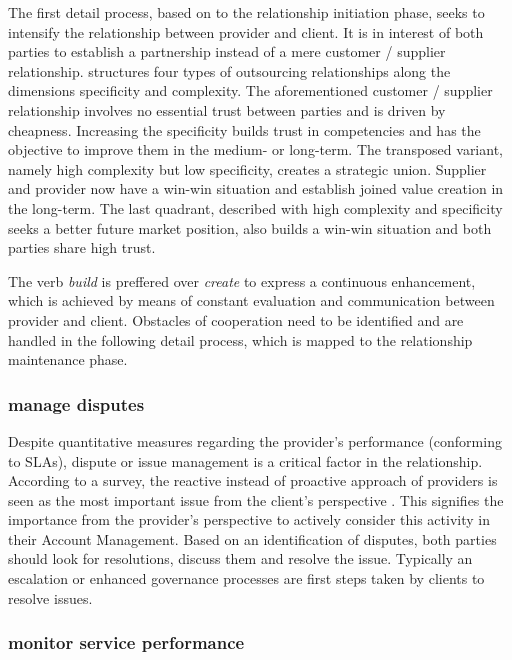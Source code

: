 	The first detail process, based on to the relationship initiation phase, seeks to intensify the relationship between provider and client. It is in interest of both parties to establish a partnership instead of a mere customer / supplier relationship. \cite{Franceschini_2003} structures four types of outsourcing relationships along the dimensions specificity and complexity. The aforementioned customer / supplier relationship involves no essential trust between parties and is driven by cheapness. Increasing the specificity builds trust in competencies and has the objective to improve them in the medium- or long-term. The transposed variant, namely high complexity but low specificity, creates a strategic union. Supplier and provider now have a win-win situation and establish joined value creation in the long-term. The last quadrant, described with high complexity and specificity seeks a better future market position, also builds a win-win situation and both parties share high trust. 
	
	The verb \textit{build} is preffered over \textit{create} to express a continuous enhancement, which is achieved by means of constant evaluation and communication between provider and client. Obstacles of cooperation need to be identified and are handled in the following detail process, which is mapped to the relationship maintenance phase. 
		
	\subsubsection{manage disputes}
	
	Despite quantitative measures regarding the provider's performance (\eg conforming to \acrshort{SLA}s), dispute or issue management is a critical factor in the relationship. According to a survey, the reactive instead of proactive approach of providers is seen as the most important issue from the client's perspective \citep{deloitte2014outsourcing}. This signifies the importance from the provider's perspective to actively consider this activity in their Account Management. Based on an identification of disputes, both parties should look for resolutions, discuss them and resolve the issue. Typically an escalation or enhanced governance processes are first steps taken by clients to resolve issues.
	
	\subsubsection{monitor service performance}
	
